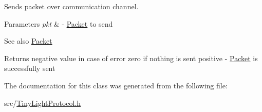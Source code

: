 Sends packet over communication channel. 
\begin{DoxyParams}{Parameters}
{\em pkt} & -\/ \hyperlink{classTiny_1_1Packet}{Packet} to send \\
\hline
\end{DoxyParams}
\begin{DoxySeeAlso}{See also}
\hyperlink{classTiny_1_1Packet}{Packet} 
\end{DoxySeeAlso}
\begin{DoxyReturn}{Returns}
negative value in case of error zero if nothing is sent positive -\/ \hyperlink{classTiny_1_1Packet}{Packet} is successfully sent 
\end{DoxyReturn}


The documentation for this class was generated from the following file\+:\begin{DoxyCompactItemize}
\item 
src/\hyperlink{TinyLightProtocol_8h}{Tiny\+Light\+Protocol.\+h}\end{DoxyCompactItemize}
